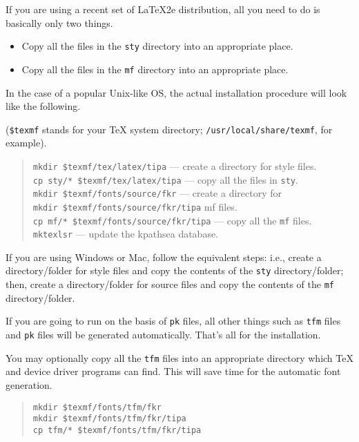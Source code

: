 If you are using a recent set of \LaTeX2e distribution, all you need
to do is basically only two things.

\begin{itemize}
\item Copy all the files in the \verb|sty| directory into an
  appropriate place.
\item Copy all the files in the \verb|mf| directory into an
  appropriate place.
\end{itemize}

In the case of a popular Unix-like OS, the actual installation
procedure will look like the following.

(\verb|$texmf| stands for your \TeX{} system directory; %
\verb|/usr/local/share/texmf|, for example).

\begin{quote}
  \verb|mkdir $texmf/tex/latex/tipa| %
    --- create a directory for style files.\\
  \verb|cp sty/* $texmf/tex/latex/tipa| %
    --- copy all the files in \verb|sty|.\\
  \verb|mkdir $texmf/fonts/source/fkr| %
    --- create a directory for\\
  \verb|mkdir $texmf/fonts/source/fkr/tipa| %
    \hspace{1em}  mf files.\\
  \verb|cp mf/* $texmf/fonts/source/fkr/tipa| %
    --- copy all the \verb|mf| files.\\
  \verb|mktexlsr| --- update the kpathsea database.
\end{quote}

If you are using Windows or Mac, follow the equivalent steps: i.e.,
create a directory/folder for style files and copy the contents of the 
\tipa{} \verb|sty| directory/folder; then, create a directory/folder
for \MF{} source files and copy the contents of the 
\tipa{} \verb|mf| directory/folder.

If you are going to run \tipa{} on the basis of \texttt{pk} files, all 
other things such as \texttt{tfm} files and \texttt{pk} files will be
generated automatically. That's all for the installation.

You may optionally copy all the \texttt{tfm} files into an appropriate
directory which \TeX{} and device driver programs can find. This will
save time for the automatic font generation.

\begin{quote}
  \verb|mkdir $texmf/fonts/tfm/fkr| \\%
  \verb|mkdir $texmf/fonts/tfm/fkr/tipa| \\%
  \verb|cp tfm/* $texmf/fonts/tfm/fkr/tipa| %
\end{quote}

